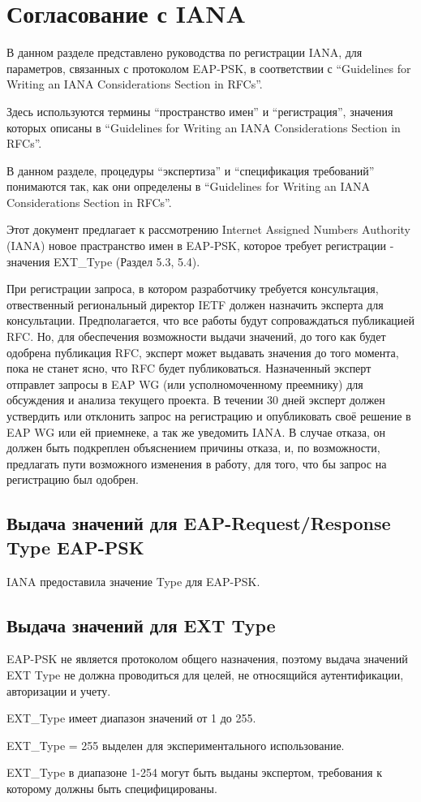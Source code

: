 \newpage
\section{Согласование с IANA}

В данном разделе представлено руководства по регистрации IANA, для параметров, связанных с протоколом EAP-PSK, в соответствии с ``Guidelines for Writing an IANA Considerations Section in RFCs''.

Здесь используются термины ``пространство имен'' и ``регистрация'', значения которых описаны в ``Guidelines for Writing an IANA Considerations Section in RFCs''.

В данном разделе, процедуры ``экспертиза'' и ``спецификация требований'' понимаются так, как они определены в ``Guidelines for Writing an IANA Considerations Section in RFCs''.

Этот документ предлагает к рассмотрению Internet Assigned Numbers Authority (IANA) новое прастранство имен в EAP-PSK, которое требует регистрации - значения EXT\_Type (Раздел 5.3, 5.4).

При регистрации запроса, в котором разработчику требуется консультация, отвественный региональный директор IETF должен назначить эксперта для консультации. Предполагается, что все работы будут сопроваждаться публикацией RFC. Но, для обеспечения возможности выдачи значений, до того как будет одобрена публикация RFC, эксперт может выдавать значения до того момента, пока не станет ясно, что RFC будет публиковаться. Назначенный эксперт отправлет запросы в EAP WG (или усполномоченному преемнику) для обсуждения и анализа текущего проекта. В течении 30 дней эксперт должен уствердить или отклонить запрос на регистрацию и опубликовать своё решение в EAP WG или ей приемнеке, а так же уведомить IANA. В случае отказа, он должен быть подкреплен объяснением причины отказа, и, по возможности, предлагать пути возможного изменения в работу, для того, что бы запрос на регистрацию был одобрен.

\subsection{Выдача значений для EAP-Request/Response Type EAP-PSK}

IANA предоставила значение Type для EAP-PSK.

\subsection{Выдача значений для EXT Type}

EAP-PSK не является протоколом общего назначения, поэтому выдача значений EXT Type не должна проводиться для целей, не относящийся аутентификации, авторизации и учету.

EXT\_Type имеет диапазон значений от 1 до 255.

EXT\_Type = 255 выделен для экспериментального использование.

EXT\_Type в диапазоне 1-254 могут быть выданы экспертом, требования к которому должны быть специфицированы.
